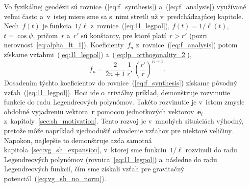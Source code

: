 \documentclass[a4paper, 12pt]{book}
\let\vec\mathbf
\begin{document}
Vo fyzikálnej geodézii sú rovnice~(\ref{eq:f_synthesis}) 
a~(\ref{eq:f_analysis}) využívané veľmi často a~v~istej miere sme sa s~nimi 
stretli už v~predchádzajúcej kapitole.  Nech~$f(t)$ je funkcia~$1 \slash \ell$ 
z~rovnice~(\ref{eq:1l_legpol}), $f(t) = 1 \slash \ell(t)$, $t = \cos\psi$, 
pričom~$r$ a~$r'$ sú konštanty, pre ktoré platí~$r > r'$ (pozri 
nerovnosť~\ref{eq:alpha_lt_1}).  Koeficienty~$f_n$ 
z~rovnice~(\ref{eq:f_analysis}) potom získame vzťahmi~(\ref{eq:1l_legpol}) 
a~(\ref{eq:lp_orthogonality_2}),
%
\begin{equation}
f_n = \frac{2}{2n + 1} \, \frac{1}{r'} \, \left( \frac{r'}{r} \right)^{n
+ 1}{.}
\end{equation}
%
Dosadením týchto koeficientov do rovnice~(\ref{eq:f_synthesis}) získame pôvodný 
vzťah~(\ref{eq:1l_legpol}).  Hoci ide o~triviálny príklad, demonštruje 
rozvinutie funkcie do radu Legendreových polynómov.  Takéto rozvinutie je 
v~istom zmysle obdobné vyjadreniu vektora~$\vec r$ pomocou jednotkových 
vektorov~$\vec e_i$ z~kapitoly~\ref{sec:sh_motivation}.  Tento rozvoj je 
v~mnohých situáciách výhodný, pretože môže napríklad zjednodušiť odvodenie 
vzťahov pre niektoré veličiny.  Napokon, najlepšie to demonštruje azda samotná 
kapitola~\ref{sec:vg_sh_expansion}, v~ktorej sme funkciu~$1 \slash \ell$ 
rozvinuli do radu Legendreových polynómov (rovnica~\ref{eq:1l_legpol}) 
a~následne do radu Legendreových funkcií, čím sme získali vzťah pre gravitačný 
potenciál~(\ref{eq:vg_sh_no_norm}).
\end{document}
